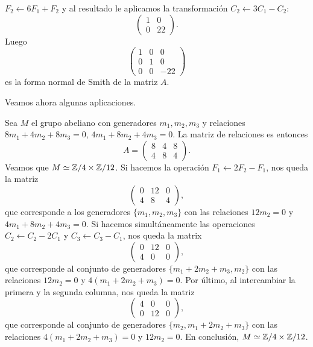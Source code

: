 \begin{example}
$F_2\leftarrow 6F_1+F_2$ y al resultado le aplicamos la transformación $C_2\leftarrow 3C_1-C_2$:
\[
\begin{pmatrix}
    1 & 0\\
    0 & 22
\end{pmatrix}.
\]
Luego
\[
\begin{pmatrix}
	1 & 0 & 0\\
	0 & 1 & 0\\
	0 & 0 & -22	
\end{pmatrix}
\]
es la forma normal de Smith de la matriz $A$.
\end{example}

Veamos ahora algunas aplicaciones.

\begin{example}
Sea $M$ el grupo abeliano con generadores $m_1,m_2,m_3$ y relaciones
$8m_1+4m_2+8m_3=0$, $4m_1+8m_2+4m_3=0$. La matriz de relaciones es entonces
\[
A=\begin{pmatrix}
8 & 4 & 8\\
4 & 8 & 4
\end{pmatrix}.
\]	
Veamos que $M\simeq\mathbb{Z}/4\times\mathbb{Z}/{12}$. Si hacemos la operación $F_1\leftarrow 2F_2-F_1$, nos queda la matriz
\[
\begin{pmatrix}
0 & 12 & 0\\
4 & 8 & 4	
\end{pmatrix},
\]
que corresponde a los generadores $\{m_1,m_2,m_3\}$ con las relaciones $12m_2=0$ y $4m_1+8m_2+4m_3=0$. Si 
hacemos simultáneamente las operaciones $C_2\leftarrow C_2-2C_1$ y $C_3\leftarrow C_3-C_1$, nos queda 
la matrix
\[
\begin{pmatrix}
0 & 12 & 0\\
4 & 0 & 0	
\end{pmatrix},
\]
que corresponde al conjunto de generadores $\{m_1+2m_2+m_3,m_2\}$ con las relaciones $12m_2=0$ y $4(m_1+2m_2+m_3)=0$. 
Por último, al intercambiar
la primera y la segunda columna, nos queda la matriz 
\[
\begin{pmatrix}
4 & 0 & 0\\
0 & 12 & 0	
\end{pmatrix},
\]
que corresponde al conjunto de generadores $\{m_2,m_1+2m_2+m_3\}$ con las relaciones $4(m_1+2m_2+m_3)=0$ y $12m_2=0$. 
En conclusión, $M\simeq\mathbb{Z}/4\times\mathbb{Z}/{12}$. 
\end{example}


